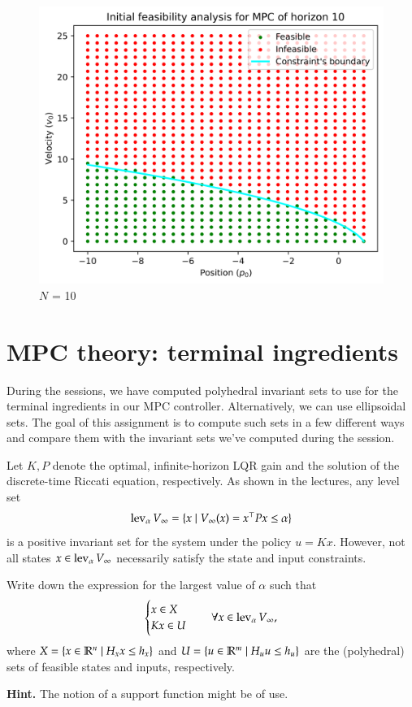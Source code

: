 \documentclass[]{article}
\begin{document}
\begin{figure}[H]
    \centering
    \begin{minipage}{0.5\textwidth}
        \centering
        \includegraphics[width=\textwidth]{images/Assignment_24_N10.png}
        \caption{$N$ = 10}
        \label{fig:assignment2_4_3}
    \end{minipage}
\end{figure}



\newpage
\section{MPC theory: terminal ingredients}
During the sessions, we have computed polyhedral invariant sets to use 
for the terminal ingredients in our MPC controller. 
Alternatively, we can use ellipsoidal sets. 
The goal of this assignment is to compute such sets in a few different ways 
and compare them with the invariant sets we've computed during 
the session.

\begin{assignment} \label{sess3:assign-lqr}
	Let $K, P$ denote the optimal, infinite-horizon LQR gain and the solution of 
	the discrete-time Riccati equation, respectively. As shown in the lectures, 
	any level set
	\[ 
		\operatorname{lev}_{\alpha} V_{\infty} = \{x \mid V_{\infty}(x) = x^\top P x \leq \alpha\}
	\]
	is a positive invariant set for the system under the policy $u = Kx$. However, 
	not all states $x \in \operatorname{lev}_{\alpha} V_{\infty}$ necessarily satisfy the state and input constraints. 

	Write down the expression for the largest value of $\alpha$ 
	such that
	\[ 
	\begin{cases}
		x \in X \\
		Kx \in U  
	\end{cases} \quad \forall x \in \operatorname{lev}_{\alpha} V_{\infty},
	\]
	where $X = \{x \in \mathbb{R}^n \mid H_x x \leq h_x\}$ and $U = \{u \in \mathbb{R}^m \mid H_u u \leq h_u \}$ are 
	the (polyhedral) sets of feasible states and inputs, respectively.

	\textbf{Hint.} The notion of a support function might be of use.
\end{assignment}
\end{document}
